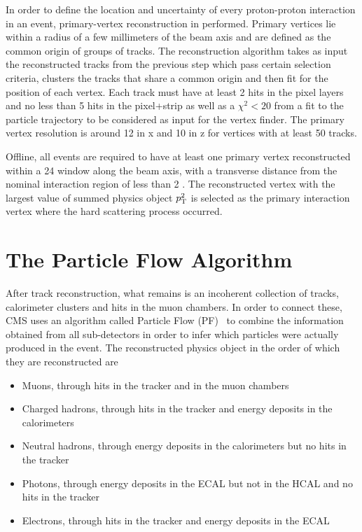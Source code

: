 In order to define the location and uncertainty of every proton-proton interaction in an event, primary-vertex reconstruction in performed. Primary vertices lie within a radius of a few millimeters of the beam axis and are defined as the common origin of groups of tracks.
The reconstruction algorithm takes as input the reconstructed tracks from the previous step which pass certain selection criteria, clusters the tracks that share a common origin and then fit for the position of each vertex. Each track must have at least 2 hits in the pixel layers and no less than 5 hits in the pixel+strip as well as a $\chi^2<20$ from a fit to the particle trajectory to be considered as input for the vertex finder. The primary vertex resolution is around 12 \micron in x and 10 \micron in z for vertices with at least 50 tracks.

Offline, all events are required to have at least one primary vertex reconstructed within a 24 \cm window along the beam axis, with a transverse distance from the nominal interaction region of less than 2 \cm. The reconstructed vertex with the largest value of summed physics object $p_{\mathrm{T}}^2$ is selected as the primary interaction vertex where the hard scattering process occurred.

\section{The Particle Flow Algorithm}

After track reconstruction, what remains is an incoherent collection of tracks, calorimeter clusters and hits in the muon chambers. In order to connect these, CMS uses an algorithm called Particle Flow (PF)~\cite{1748-0221-12-10-P10003} to combine the information obtained from all sub-detectors in order to infer which particles were actually produced in the event.
The reconstructed physics object in the order of which they are reconstructed are
\begin{itemize}
  \item Muons, through hits in the tracker and in the muon chambers
  \item Charged hadrons, through hits in the tracker and energy deposits in the calorimeters
  \item Neutral hadrons, through energy deposits in the calorimeters but no hits in the tracker
  \item Photons, through energy deposits in the ECAL but not in the HCAL and no hits in the tracker
  \item Electrons, through hits in the tracker and energy deposits in the ECAL
\end{itemize}

